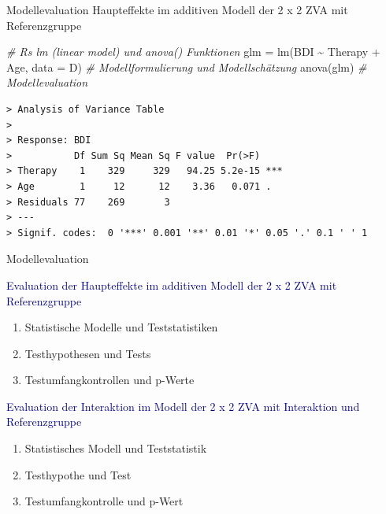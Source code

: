 \documentclass[
  8pt,
  ignorenonframetext,
]{beamer}
\newenvironment{Shaded}{\begin{snugshade}}{\end{snugshade}}
\newcommand{\AttributeTok}[1]{\textcolor[rgb]{0.77,0.63,0.00}{#1}}
\newcommand{\CommentTok}[1]{\textcolor[rgb]{0.56,0.35,0.01}{\textit{#1}}}
\newcommand{\FunctionTok}[1]{\textcolor[rgb]{0.00,0.00,0.00}{#1}}
\newcommand{\NormalTok}[1]{#1}
\newcommand{\OtherTok}[1]{\textcolor[rgb]{0.56,0.35,0.01}{#1}}
\newcommand{\SpecialCharTok}[1]{\textcolor[rgb]{0.00,0.00,0.00}{#1}}
\begin{document}
\begin{frame}[fragile]{\small Modellevaluation \textbar{} Haupteffekte
im additiven Modell der 2 x 2 ZVA mit Referenzgruppe}
\begin{Shaded}
\begin{Highlighting}[]
\CommentTok{\# R\textquotesingle{}s lm (linear model) und anova() Funktionen}
\NormalTok{glm        }\OtherTok{=} \FunctionTok{lm}\NormalTok{(BDI }\SpecialCharTok{\textasciitilde{}}\NormalTok{ Therapy }\SpecialCharTok{+}\NormalTok{ Age, }\AttributeTok{data =}\NormalTok{ D)                }\CommentTok{\# Modellformulierung und Modellschätzung}
\FunctionTok{anova}\NormalTok{(glm)                                                    }\CommentTok{\# Modellevaluation}
\end{Highlighting}
\end{Shaded}

\begin{verbatim}
> Analysis of Variance Table
> 
> Response: BDI
>           Df Sum Sq Mean Sq F value  Pr(>F)    
> Therapy    1    329     329   94.25 5.2e-15 ***
> Age        1     12      12    3.36   0.071 .  
> Residuals 77    269       3                    
> ---
> Signif. codes:  0 '***' 0.001 '**' 0.01 '*' 0.05 '.' 0.1 ' ' 1
\end{verbatim}
\end{frame}

\begin{frame}{Modellevaluation}
\protect\hypertarget{modellevaluation-2}{}

\textcolor{darkblue}{Evaluation der Haupteffekte  im additiven Modell der 2 x 2 ZVA mit Referenzgruppe}

\begin{enumerate}
[(1)]
\item
  Statistische Modelle und Teststatistiken
\item
  Testhypothesen und Tests
\item
  Testumfangkontrollen und p-Werte
\end{enumerate}

\textcolor{darkblue}{Evaluation der Interaktion im Modell der 2 x 2 ZVA mit Interaktion und Referenzgruppe}

\begin{enumerate}
[(1)]
\item
  Statistisches Modell und Teststatistik
\item
  Testhypothe und Test
\item
  Testumfangkontrolle und p-Wert
\end{enumerate}
\end{frame}
\end{document}
